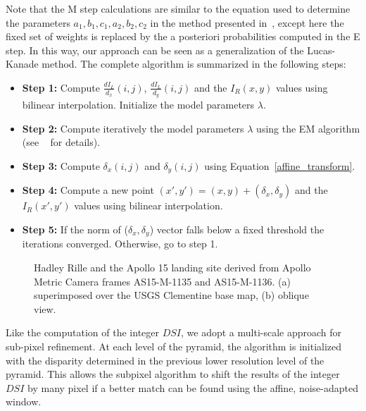 Note that the M step calculations are similar to the equation used to
determine the parameters $a_1, b_1, c_1, a_2, b_2, c_2$ in the method
presented in~\cite{Stein06:attenuating}, except here the fixed set of
weights is replaced by the a posteriori probabilities computed in the
E step. In this way, our approach can be seen as a generalization of
the Lucas-Kanade method.  The complete algorithm is summarized in the following steps:
\begin{itemize}
\item {\bf Step 1:} Compute $\frac{dI_L}{d_x}(i,j)$, $\frac{dI_L}{d_y}(i,j)$ and the $I_R(x,y)$ values using bilinear interpolation. Initialize the model parameters $\lambda$.
\item {\bf Step 2:} Compute iteratively the model parameters $\lambda$ using the EM algorithm (see ~\cite{Nefian09:bayesian} for details). 
\item {\bf Step 3:} Compute $\delta_x(i,j)$ and $\delta_y(i,j)$ using Equation~\ref{affine_transform}.
\item {\bf Step 4:} Compute a new point $(x', y') = (x, y) + (\delta_x, \delta_y)$ and the $I_R(x',y')$ values using bilinear interpolation.
\item {\bf Step 5:} If the norm of ($\delta_x, \delta_y$) vector falls below a fixed threshold the iterations converged. Otherwise, go to step 1.
\end{itemize}

\begin{figure}[bt]
  \begin{center}
    \caption{Hadley Rille and the Apollo 15 landing site derived from
      Apollo Metric Camera frames AS15-M-1135 and AS15-M-1136. (a)
      superimposed over the USGS Clementine base map, (b) oblique view.}
    \label{results_crater_img}
  \end{center}
\end{figure} 

Like the computation of the integer $DSI$, we adopt a multi-scale
approach for sub-pixel refinement. At each level of the pyramid, the
algorithm is initialized with the disparity determined in the previous
lower resolution level of the pyramid. This allows the subpixel
algorithm to shift the results of the integer $DSI$ by many pixel if
a better match can be found using the affine, noise-adapted window.



